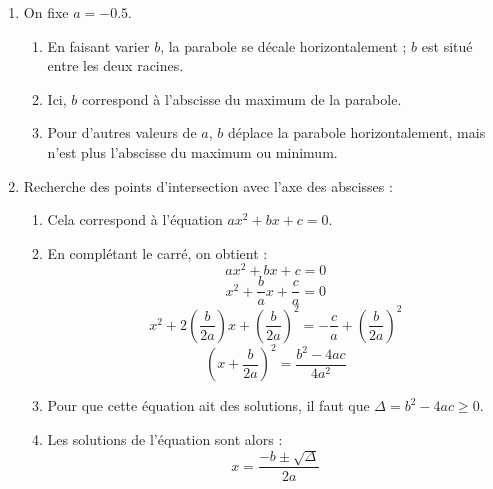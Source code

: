 \documentclass{article}
\begin{document}
\begin{enumerate}
    \item On fixe $a = -0.5$.
    \begin{enumerate}
        \item En faisant varier $b$, la parabole se décale horizontalement ; $b$ est situé entre les deux racines.
        \item Ici, $b$ correspond à l'abscisse du maximum de la parabole.
        \item Pour d'autres valeurs de $a$, $b$ déplace la parabole horizontalement, mais n'est plus l'abscisse du maximum ou minimum.
    \end{enumerate}
    \item Recherche des points d'intersection avec l'axe des abscisses :
        \begin{enumerate}
            \item Cela correspond à l'équation $ax^2 + bx + c = 0$.
            \item En complétant le carré, on obtient :
\[
            ax^2 + bx + c = 0
\]
\[
            x^2 + \frac{b}{a} x + \frac{c}{a} = 0
\]
\[
            x^2 + 2\left(\frac{b}{2a}\right)x + \left(\frac{b}{2a}\right)^2 = -\frac{c}{a} + \left(\frac{b}{2a}\right)^2
\]
\[
            \left(x + \frac{b}{2a}\right)^2 = \frac{b^2 - 4ac}{4a^2}
\]
            \item Pour que cette équation ait des solutions, il faut que $\Delta = b^2 - 4ac \geq 0$.
            \item Les solutions de l'équation sont alors :
\[
            x = \frac{-b \pm \sqrt{\Delta}}{2a}
\]
        \end{enumerate}
\end{enumerate}
\end{document}
